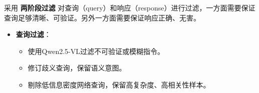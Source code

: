 \documentclass[zihao=false,fontset=windows]{ctexart}
\begin{document}
采用 \textbf{两阶段过滤 }对查询（query）和响应（response）进行过滤，一方面需要保证查询足够清晰、可验证。另外一方面需要保证响应正确、无害。\par

\begin{itemize}[label=\textcolor{feishuBlue}{\textbullet}]
\item \textbf{查询过滤}：
\begin{itemize}[label=\textcolor{feishuBlue}{\textbullet}]
\item 使用\textcolor{feishuRed}{Qwen2.5-VL过滤}不可验证或模糊指令。

\end{itemize}

\begin{itemize}[label=\textcolor{feishuBlue}{\textbullet}]
\item 修订歧义查询，保留语义意图。

\end{itemize}

\begin{itemize}[label=\textcolor{feishuBlue}{\textbullet}]
\item 剔除低信息密度网络查询，保留高复杂度、高相关性样本。

\end{itemize}

\end{itemize}
\end{document}
